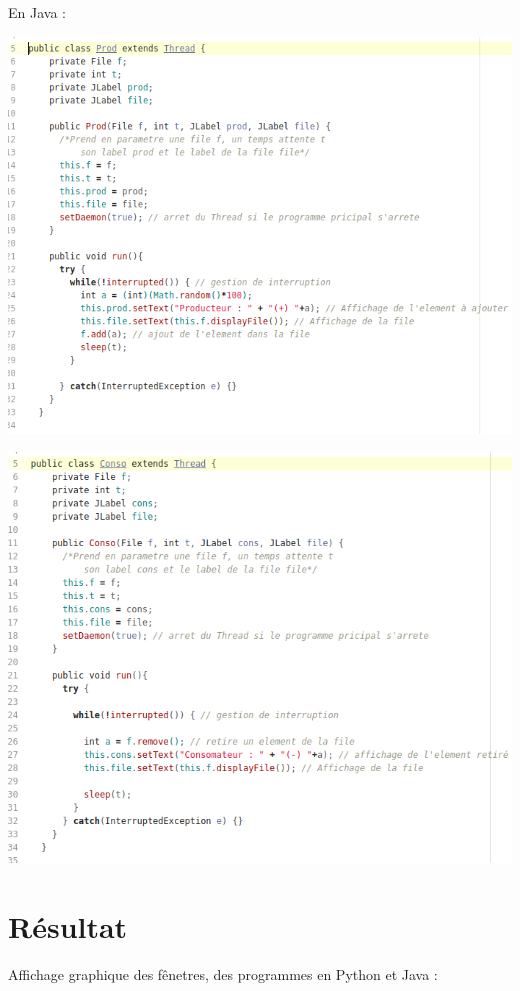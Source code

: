 \documentclass{article}
\begin{document}
En Java :
\begin{center}
  \includegraphics[scale=0.6]{Prodjava.png}
\end{center}
\begin{center}
  \includegraphics[scale=0.6]{Consojava.png}
\end{center}

\section{Résultat}

Affichage graphique des fênetres, des programmes en Python et Java :
\end{document}
